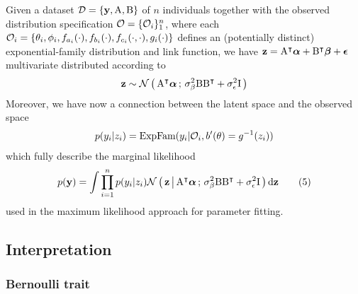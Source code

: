 Given a dataset $\mathcal{D} = \{\mathbf y, \mathrm A, \mathrm B\}$ of $n$
individuals together with the observed distribution specification
$\mathcal{O}=\{\mathcal{O}_i\}_1^n$, where each
$\mathcal{O}_i = \{\theta_i, \phi_i, f_{a_i}(\cdot), f_{b_i}(\cdot), f_{c_i}(\cdot, \cdot), g_i(\cdot)\}$
defines an (potentially distinct) exponential-family distribution and link
function, we have
$\mathbf z = \mathrm A^\intercal\boldsymbol\alpha + \mathrm B^\intercal\boldsymbol\beta + \boldsymbol\epsilon$
multivariate distributed according to
\begin{align*}
  \mathbf z \sim \mathcal{N}\left(\, {\mathrm A^\intercal \boldsymbol\alpha} \,;\, {\sigma^2_{\beta} \mathrm B\mathrm
	B^\intercal + \sigma^2_{\epsilon} \mathrm I} \,\right)
\end{align*}
Moreover, we have now a connection between the latent space and the observed space
\begin{align*}
  p(y_i | z_i) = \text{ExpFam} ({y_i | \mathcal{O}_i, b'(\theta)=g^{-1}(z_i)})
\end{align*}
which fully describe the marginal likelihood
\begin{align*}
  p(\mathbf y) = \int \prod_{i=1}^n p(y_i|z_i) \mathcal{N}\left(\, { {\mathbf z} \, \big| \, {\mathrm A^\intercal
	\boldsymbol\alpha} } \,;\, { {\sigma^2_{\beta} \mathrm B\mathrm B^\intercal + \sigma^2_{\epsilon}
	\mathrm I} } \,\right) \mathrm d \mathbf z \tag{5}
\end{align*}
used in the maximum likelihood approach for parameter fitting.

\subsection{Interpretation}

\subsubsection{Bernoulli trait}

